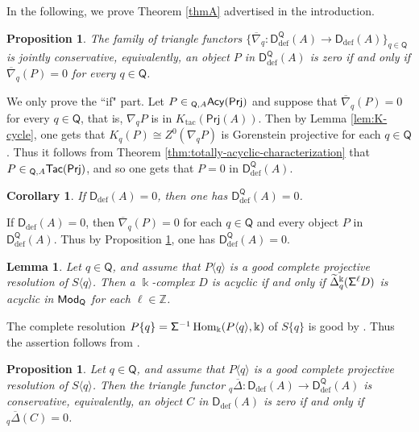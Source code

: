 \documentclass{amsart}
\theoremstyle{bfupright head,slanted body}
\theoremstyle{bfupright head,upright body}
\theoremstyle{fixed bf head,slanted body}
\newtheorem{prp}[res]{Proposition}      \newtheorem*{prp*}{Proposition}
\newtheorem{cor}[res]{Corollary}        \newtheorem*{cor*}{Corollary}
\newtheorem{lem}[res]{Lemma}            \newtheorem*{lem*}{Lemma}
\theoremstyle{fixed bf head,upright body}
\theoremstyle{numbered paragraph}
\newenvironment{prf*}[1][Proof]{%
	\begin{proof}[\bf #1]
		\setcounter{equation}{0}
		\renewcommand{\theequation}{\arabic{equation}}}
	{\end{proof}
}
\numberwithin{equation}{res}
\newcommand{\TacQ}{{}_{\Q,A}\mathsf{Tac}(\sf Prj)}
\newcommand{\AcQ}{{}_{\Q,A}\mathsf{Acy}(\sf Prj)}
\newcommand{\Prj}[1]{\mathsf{Prj}(#1)}
\newcommand{\Hom}{\operatorname{Hom}}
\newcommand{\Q}{\mathsf{Q}}
\newcommand{\kk}{\Bbbk}
\newcommand{\rMod}[1]{{\sf{Mod}}_{#1}}
\begin{document}
In the following, we prove Theorem \ref{thmA} advertised in the introduction.

\begin{prp}\label{cor:defect-detection}
The family of triangle functors $\{\overline{\nabla}_q:\mathsf D_{\mathrm{def}}^{\Q}(A)\to\mathsf D_{\mathrm{def}}(A)\}_{q\in\Q}$ is jointly conservative, equivalently, an object $P$ in $\mathsf D_{\mathrm{def}}^{\Q}(A)$ is zero if and only if $\overline{\nabla}_q(P)=0$ for every $q\in\Q$.
\end{prp}

\begin{prf*}
We only prove the ``if" part. Let $P\in\AcQ$ and suppose that $\overline{\nabla}_q(P)=0$ for every $q\in\Q$, that is, $\nabla_qP$ is in $K_{\mathrm{tac}}(\Prj A)$. Then by Lemma \ref{lem:K-cycle}, one gets that $K_q(P)\cong Z^0(\nabla_qP)$ is Gorenstein projective for each $q\in\Q$. Thus it follows from Theorem \ref{thm:totally-acyclic-characterization} that $P\in\TacQ$, and so one gets that $P=0$ in $\mathsf D_{\mathrm{def}}^{\Q}(A)$.
\end{prf*}

\begin{cor}\label{cor:defect-vanishing-forward}
If $\mathsf D_{\mathrm{def}}(A)=0$, then one has $\mathsf D_{\mathrm{def}}^{\Q}(A)=0$.
\end{cor}

\begin{prf*}
If $\mathsf D_{\mathrm{def}}(A)=0$, then $\overline{\nabla}_q(P)=0$ for each $q\in\Q$ and every object $P$ in $\mathsf D_{\mathrm{def}}^{\Q}(A)$. Thus by Proposition \ref{cor:defect-detection}, one has $\mathsf D_{\mathrm{def}}^{\Q}(A)=0$.
\end{prf*}

\begin{lem}\label{lem:good-detection}
Let $q\in\Q$, and assume that $P\langle q\rangle$ is a good complete projective resolution of $S\langle q\rangle$. Then a $\kk$-complex $D$ is acyclic if and only if $\widetilde{\Delta}_q^{\kk}({\sf\Sigma}^{\ell}D)$ is acyclic in $\rMod{\Q}$ for each $\ell\in\mathbb Z$.
\end{lem}

\begin{prf*}
The complete resolution $P\{q\}={\sf\Sigma}^{-1}\Hom_{\kk}(P\langle q\rangle,\kk)$ of $S\{q\}$ is good by \cite[Lemma 2.9$(ii)$]{HJ26}. Thus the assertion follows from \cite[Lemma 4.10]{HJ26}.
\end{prf*}

\begin{prp}\label{thm:defect-left-conservative}
Let $q\in\Q$, and assume that $P\langle q\rangle$ is a good complete projective resolution of $S\langle q\rangle$. Then the triangle functor ${}_q\overline{\Delta}: \mathsf D_{\mathrm{def}}(A)\to\mathsf D_{\mathrm{def}}^{\Q}(A)$ is conservative, equivalently, an object $C$ in $\mathsf D_{\mathrm{def}}(A)$ is zero if and only if ${}_q\overline{\Delta}(C)=0$.
\end{prp}
\end{document}

